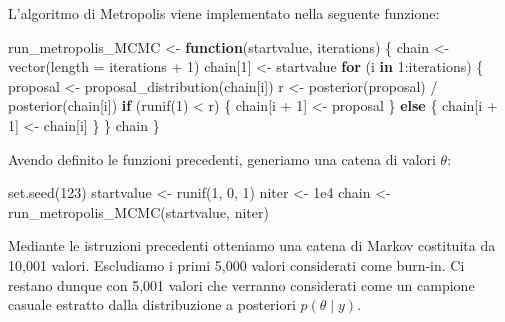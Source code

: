 \documentclass[
  11pt,
]{krantz}
\makeatletter
\newenvironment{Shaded}{\begin{snugshade}}{\end{snugshade}}
\newcommand{\AttributeTok}[1]{\textcolor[rgb]{0.61,0.61,0.61}{#1}}
\newcommand{\ControlFlowTok}[1]{\textcolor[rgb]{0.27,0.27,0.27}{\textbf{#1}}}
\newcommand{\DecValTok}[1]{\textcolor[rgb]{0.06,0.06,0.06}{#1}}
\newcommand{\FloatTok}[1]{\textcolor[rgb]{0.06,0.06,0.06}{#1}}
\newcommand{\FunctionTok}[1]{\textcolor[rgb]{0,0,0}{#1}}
\newcommand{\NormalTok}[1]{#1}
\newcommand{\OtherTok}[1]{\textcolor[rgb]{0.37,0.37,0.37}{#1}}
\newcommand{\SpecialCharTok}[1]{\textcolor[rgb]{0,0,0}{#1}}
\newenvironment{kframe}{%
\medskip{}
\setlength{\fboxsep}{.8em}
 \def\at@end@of@kframe{}%
 \ifinner\ifhmode%
  \def\at@end@of@kframe{\end{minipage}}%
  \begin{minipage}{\columnwidth}%
 \fi\fi%
 \def\FrameCommand##1{\hskip\@totalleftmargin \hskip-\fboxsep
 \colorbox{shadecolor}{##1}\hskip-\fboxsep
     \hskip-\linewidth \hskip-\@totalleftmargin \hskip\columnwidth}%
 \MakeFramed {\advance\hsize-\width
   \@totalleftmargin\z@ \linewidth\hsize
   \@setminipage}}%
 {\par\unskip\endMakeFramed%
 \at@end@of@kframe}
\renewenvironment{Shaded}{\begin{kframe}}{\end{kframe}}
\theoremstyle{definition}
\theoremstyle{definition}
\theoremstyle{definition}
\theoremstyle{definition}
\theoremstyle{remark}
\makeatother
\begin{document}
L'algoritmo di Metropolis viene implementato nella seguente funzione:

\begin{Shaded}
\begin{Highlighting}[]
\NormalTok{run\_metropolis\_MCMC }\OtherTok{\textless{}{-}} \ControlFlowTok{function}\NormalTok{(startvalue, iterations) \{}
\NormalTok{  chain }\OtherTok{\textless{}{-}} \FunctionTok{vector}\NormalTok{(}\AttributeTok{length =}\NormalTok{ iterations }\SpecialCharTok{+} \DecValTok{1}\NormalTok{)}
\NormalTok{  chain[}\DecValTok{1}\NormalTok{] }\OtherTok{\textless{}{-}}\NormalTok{ startvalue}
  \ControlFlowTok{for}\NormalTok{ (i }\ControlFlowTok{in} \DecValTok{1}\SpecialCharTok{:}\NormalTok{iterations) \{}
\NormalTok{    proposal }\OtherTok{\textless{}{-}} \FunctionTok{proposal\_distribution}\NormalTok{(chain[i])}
\NormalTok{    r }\OtherTok{\textless{}{-}} \FunctionTok{posterior}\NormalTok{(proposal) }\SpecialCharTok{/} \FunctionTok{posterior}\NormalTok{(chain[i])}
    \ControlFlowTok{if}\NormalTok{ (}\FunctionTok{runif}\NormalTok{(}\DecValTok{1}\NormalTok{) }\SpecialCharTok{\textless{}}\NormalTok{ r) \{}
\NormalTok{      chain[i }\SpecialCharTok{+} \DecValTok{1}\NormalTok{] }\OtherTok{\textless{}{-}}\NormalTok{ proposal}
\NormalTok{    \} }\ControlFlowTok{else}\NormalTok{ \{}
\NormalTok{      chain[i }\SpecialCharTok{+} \DecValTok{1}\NormalTok{] }\OtherTok{\textless{}{-}}\NormalTok{ chain[i]}
\NormalTok{    \}}
\NormalTok{  \}}
\NormalTok{  chain}
\NormalTok{\}}
\end{Highlighting}
\end{Shaded}

Avendo definito le funzioni precedenti, generiamo una catena di valori \(\theta\):

\begin{Shaded}
\begin{Highlighting}[]
\FunctionTok{set.seed}\NormalTok{(}\DecValTok{123}\NormalTok{)}
\NormalTok{startvalue }\OtherTok{\textless{}{-}} \FunctionTok{runif}\NormalTok{(}\DecValTok{1}\NormalTok{, }\DecValTok{0}\NormalTok{, }\DecValTok{1}\NormalTok{)}
\NormalTok{niter }\OtherTok{\textless{}{-}} \FloatTok{1e4}
\NormalTok{chain }\OtherTok{\textless{}{-}} \FunctionTok{run\_metropolis\_MCMC}\NormalTok{(startvalue, niter)}
\end{Highlighting}
\end{Shaded}

Mediante le istruzioni precedenti otteniamo una catena di Markov costituita da 10,001 valori. Escludiamo i primi 5,000 valori considerati come burn-in. Ci restano dunque con 5,001 valori che verranno considerati come un campione casuale estratto dalla distribuzione a posteriori \(p(\theta \mid y)\).
\end{document}

